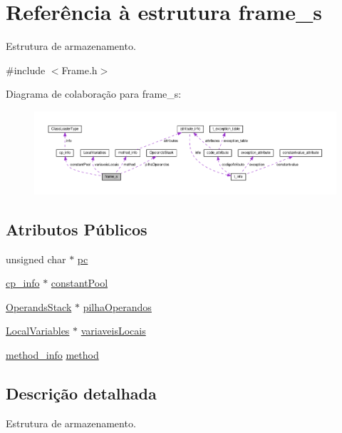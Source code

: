 \hypertarget{structframe__s}{}\section{Referência à estrutura frame\+\_\+s}
\label{structframe__s}


Estrutura de armazenamento.  




{\ttfamily \#include $<$Frame.\+h$>$}



Diagrama de colaboração para frame\+\_\+s\+:
\nopagebreak
\begin{figure}[H]
\begin{center}
\leavevmode
\includegraphics[width=350pt]{structframe__s__coll__graph}
\end{center}
\end{figure}
\subsection*{Atributos Públicos}
\begin{DoxyCompactItemize}
\item 
unsigned char $\ast$ \hyperlink{structframe__s_a74703c716b34b0be42af1c698ef9f621}{pc}
\item 
\hyperlink{structcp__info}{cp\+\_\+info} $\ast$ \hyperlink{structframe__s_a13764e54bdd2ba069584ea6626590efe}{constant\+Pool}
\item 
\hyperlink{classOperandsStack}{Operands\+Stack} $\ast$ \hyperlink{structframe__s_a39f21b480e26b73443d41e72d1338266}{pilha\+Operandos}
\item 
\hyperlink{classLocalVariables}{Local\+Variables} $\ast$ \hyperlink{structframe__s_a7d14a487bba511d5768e6d1b6b6f8be0}{variaveis\+Locais}
\item 
\hyperlink{structmethod__info}{method\+\_\+info} \hyperlink{structframe__s_a2805e18c2a9320c94f2e0e57da95a042}{method}
\end{DoxyCompactItemize}


\subsection{Descrição detalhada}
Estrutura de armazenamento. 

